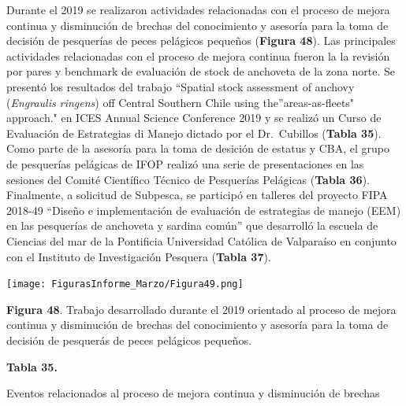 \documentclass[
  spanish,
]{article}
\begin{document}
Durante el 2019 se realizaron actividades relacionadas con el proceso de
mejora continua y disminución de brechas del conocimiento y asesoría
para la toma de decisión de pesquerías de peces pelágicos pequeños
(\textbf{Figura 48}). Las principales actividades relacionadas con el
proceso de mejora continua fueron la la revisión por pares y benchmark
de evaluación de stock de anchoveta de la zona norte. Se presentó los
resultados del trabajo ``Spatial stock assessment of anchovy
(\textit{Engraulis ringens}) off Central Southern Chile using
the''areas-as-fleets" approach." en ICES Annual Science Conference 2019
y se realizó un Curso de Evaluación de Estrategias di Manejo dictado por
el Dr.~Cubillos (\textbf{Tabla 35}). Como parte de la asesoría para la
toma de desición de estatus y CBA, el grupo de pesquerías pelágicas de
IFOP realizó una serie de presentaciones en las sesiones del Comité
Científico Técnico de Pesquerías Pelágicas (\textbf{Tabla 36}).
Finalmente, a solicitud de Subpesca, se participó en talleres del
proyecto FIPA 2018-49 ``Diseño e implementación de evaluación de
estrategias de manejo (EEM) en las pesquerías de anchoveta y sardina
común'' que desarrolló la escuela de Ciencias del mar de la Pontificia
Universidad Católica de Valparaíso en conjunto con el Instituto de
Investigación Pesquera (\textbf{Tabla 37}).

\begin{center}
\texttt{[image: FigurasInforme\_Marzo/Figura49.png]}
\end{center}

\small

\textbf{Figura 48}. Trabajo desarrollado durante el 2019 orientado al
proceso de mejora continua y disminución de brechas del conocimiento y
asesoría para la toma de decisión de pesquerás de peces pelágicos
pequeños. \vspace{0.5cm} \normalsize

\pagebreak

\small
\begin{center} 
\textbf{Tabla 35.}
\end{center}
\begin{center} 
\vspace{-0.2cm} Eventos relacionados al proceso de mejora continua y disminución de brechas
\end{center}
\vspace{-0.2cm}
\end{document}
